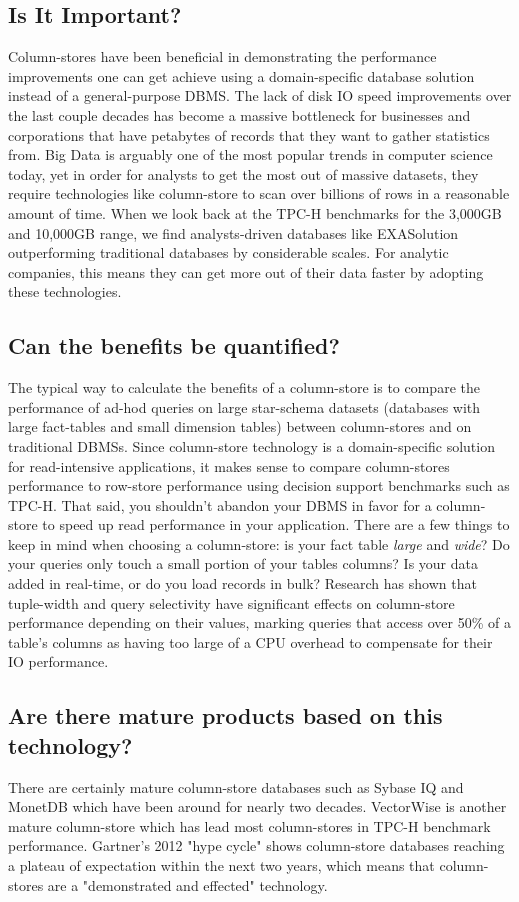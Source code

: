 \documentclass[11pt,a4paper]{report}
\begin{document}
\subsection{Is It Important?}
Column-stores have been beneficial in demonstrating the performance improvements one can get achieve using a domain-specific database solution instead of a general-purpose DBMS. The lack of disk IO speed improvements over the last couple decades has become a massive bottleneck for businesses and corporations that have petabytes of records that they want to gather statistics from. Big Data is arguably one of the most popular trends in computer science today, yet in order for analysts to get the most out of massive datasets, they require technologies like column-store to scan over billions of rows in a reasonable amount of time. When we look back at the TPC-H benchmarks for the 3,000GB and 10,000GB range, we find analysts-driven databases like EXASolution outperforming traditional databases by considerable scales. \cite{tpchbm} For analytic companies, this means they can get more out of their data faster by adopting these technologies.

\subsection{Can the benefits be quantified?}
The typical way to calculate the benefits of a column-store is to compare the performance of ad-hod queries on large star-schema datasets (databases with large fact-tables and small dimension tables) between column-stores and on traditional DBMSs. Since column-store technology is a domain-specific solution for read-intensive applications, it makes sense to compare column-stores performance to row-store performance using decision support benchmarks such as TPC-H. That said, you shouldn't abandon your DBMS in favor for a column-store to speed up read performance in your application. There are a few things to keep in mind when choosing a column-store: is your fact table \textit{large} and  \textit{wide}? Do your queries only touch a small portion of your tables columns? Is your data added in real-time, or do you load records in bulk? Research has shown that tuple-width and query selectivity have significant effects on column-store performance depending on their values, marking queries that access over 50\% of a table's columns as having too large of a CPU overhead to compensate for their IO performance. \cite{harizopoulos2006performance}

\subsection{Are there mature products based on this technology?}
There are certainly mature column-store databases such as Sybase IQ and MonetDB which have been around for nearly two decades. VectorWise is another mature column-store which has lead most column-stores in TPC-H benchmark performance. \cite{tpchbm} Gartner's 2012 "hype cycle" shows column-store databases reaching a plateau of expectation within the next two years, which means that column-stores are a "demonstrated and effected"\cite{gartnerhype} technology. 
\end{document}
